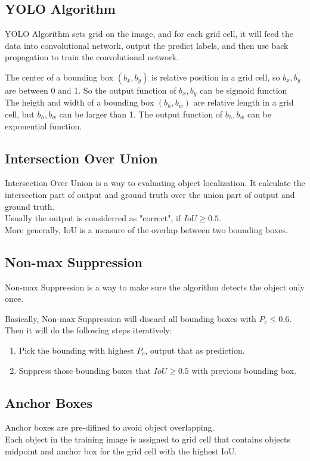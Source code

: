 \documentclass{article}
\begin{document}
	\subsection{YOLO Algorithm}
		\begin{flushleft}
			YOLO Algorithm sets grid on the image, and for each grid cell, it will feed the data into convolutional network, output the predict labels, and then use back propagation to train the convolutional network.
		\end{flushleft}
		\begin{flushleft}
			The center of a bounding box $(b_x, b_y)$ is relative position in a grid cell, so $b_x, b_y$ are between 0 and 1. So the output function of $b_x, b_y$ can be sigmoid function\\
			The heigth and width of a bounding box $(b_h, b_w)$ are relative length in a grid cell, but $b_h, b_w$ can be larger than 1. The output function of $b_h, b_w$ can be exponential function.
		\end{flushleft}
	\subsection{Intersection Over Union}
		\begin{flushleft}
			Intersection Over Union is a way to evaluating object localization. It calculate the intersection part of output and ground truth over the union part of output and ground truth.\\ Usually the output is considerred as "correct", if $IoU \geq 0.5$.\\
			More generally, IoU is a measure of the overlap between two bounding boxes.
		\end{flushleft}
	\subsection{Non-max Suppression}
		\begin{flushleft}
			Non-max Suppression is a way to make sure the algorithm detects the object only once.
		\end{flushleft}
		\begin{flushleft}
			Basically, Non-max Suppression will discard all bounding boxes with $P_c \leq 0.6$.\\
			Then it will do the following steps iteratively:
			\begin{enumerate}
				\item Pick the bounding with highest $P_c$, output that as prediction.
				\item Suppress those bounding boxes that $IoU \geq 0.5$ with previous bounding box.
			\end{enumerate}
		\end{flushleft}
	\subsection{Anchor Boxes}
		\begin{flushleft}
			Anchor boxes are pre-difined to avoid object overlapping.\\
			Each object in the training image is assigned to grid cell that contains objects midpoint and anchor box for the grid cell with the highest IoU.
		\end{flushleft}
\end{document}
